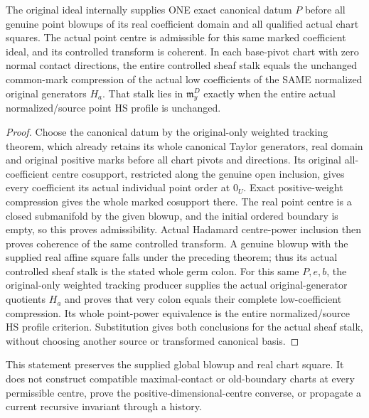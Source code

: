 \begin{theorem}
\label{hir:actual-original-point-weighted-controlled-stalk-tracking}
\leanok
The original ideal internally supplies ONE exact canonical datum $P$ before
all genuine point blowups of its real coefficient domain and all qualified
actual chart squares. The actual point centre is admissible for this same
marked coefficient ideal, and its controlled transform is coherent. In each
base-pivot chart with zero normal contact
directions, the entire controlled sheaf stalk equals the unchanged
common-mark compression of the actual low coefficients of the SAME
normalized original generators $H_a$. That stalk lies in
$\mathfrak m_y^D$ exactly when the entire actual normalized/source point
HS profile is unchanged.
\end{theorem}
\begin{proof}
Choose the canonical datum by the original-only weighted tracking theorem,
which already retains its whole canonical Taylor generators, real domain
and original positive marks before all chart pivots and directions. Its
original all-coefficient centre cosupport, restricted along the genuine open
inclusion, gives every coefficient its actual individual point order at
$0_U$. Exact positive-weight compression gives the whole marked cosupport
there. The real point centre is a closed submanifold by the given blowup,
and the initial ordered boundary is empty, so this proves admissibility.
Actual Hadamard centre-power inclusion then proves coherence of the same
controlled transform. A
genuine blowup with the supplied real affine square falls under the
preceding theorem; thus its actual controlled sheaf stalk is the stated
whole germ colon. For this same $P,e,b$, the original-only weighted tracking
producer supplies the actual original-generator quotients $H_a$ and proves
that very colon equals their complete low-coefficient compression. Its
whole point-power equivalence is the entire normalized/source HS profile
criterion. Substitution gives both conclusions for the actual sheaf stalk,
without choosing another source or transformed canonical basis.
\end{proof}

This statement preserves the supplied global blowup and real chart square.
It does not construct compatible maximal-contact or old-boundary charts at
every permissible centre, prove the positive-dimensional-centre converse,
or propagate a current recursive invariant through a history.
